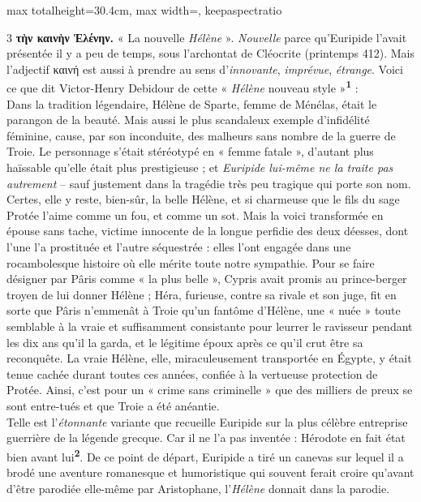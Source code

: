 \documentclass[11pt,twoside]{book}
\newcommand{\italique}[1]{\textit{#1}}
\newcommand{\marqueur}[1]{\textsuperscript{\color{rubricRed}\textbf{#1}}}
\begin{document}
\begin{adjustbox}{max totalheight=30.4cm, max width=\textwidth, keepaspectratio}
\begin{minipage}{\textwidth}
{\begin{multicols}{3}
 \textbf{τὴν καινὴν Ἑλένην.} « La nouvelle \italique{Hélène} ». \italique{Nouvelle} parce qu'Euripide l'avait présentée il y a peu de temps, sous l'archontat de Cléocrite (printemps 412). Mais l'adjectif καινή est aussi à prendre au sens d'\italique{innovante}, \italique{imprévue}, \italique{étrange}. Voici ce que dit Victor-Henry Debidour de cette « \italique{Hélène} nouveau style »\marqueur{1} :\\ Dans la tradition légendaire, Hélène de Sparte, femme de Ménélas, était le parangon de la beauté. Mais aussi le plus scandaleux exemple d'infidélité féminine, cause, par son inconduite, des malheurs sans nombre de la guerre de Troie. Le personnage s'était stéréotypé en « femme fatale », d'autant plus haïssable qu'elle était plus prestigieuse ; et \italique{Euripide lui-même ne la traite pas autrement} -- sauf justement dans la tragédie très peu tragique qui porte son nom. Certes, elle y reste, bien-sûr, la belle Hélène, et si charmeuse que le fils du sage Protée l'aime comme un fou, et comme un sot. Mais la voici transformée en épouse sans tache, victime innocente de la longue perfidie des deux déesses, dont l'une l'a prostituée et l'autre séquestrée : elles l'ont engagée dans une rocambolesque histoire où elle mérite toute notre sympathie. Pour se faire désigner par Pâris comme « la plus belle », Cypris avait promis au prince-berger troyen de lui donner Hélène ; Héra, furieuse, contre sa rivale et son juge, fit en sorte que Pâris n'emmenât à Troie qu'un fantôme d'Hélène, une « nuée » toute semblable à la vraie et suffisamment consistante pour leurrer le ravisseur pendant les dix ans qu'il la garda, et le légitime époux après ce qu'il crut être sa reconquête. La vraie Hélène, elle, miraculeusement transportée en Égypte, y était tenue cachée durant toutes ces années, confiée à la vertueuse protection de Protée. Ainsi, c'est pour un « crime sans criminelle » que des milliers de preux se sont entre-tués et que Troie a été anéantie.\\ Telle est l'\italique{étonnante} variante que recueille Euripide sur la plus célèbre entreprise guerrière de la légende grecque. Car il ne l'a pas inventée : Hérodote en fait état bien avant lui\marqueur{2}. De ce point de départ, Euripide a tiré un canevas sur lequel il a brodé une aventure romanesque et humoristique qui souvent ferait croire qu'avant d'être parodiée elle-même par Aristophane, l'\italique{Hélène} donnait dans la parodie.
\par\vspace{1.5pt}

\end{multicols}}
\end{minipage}
\end{adjustbox}
\end{document}
